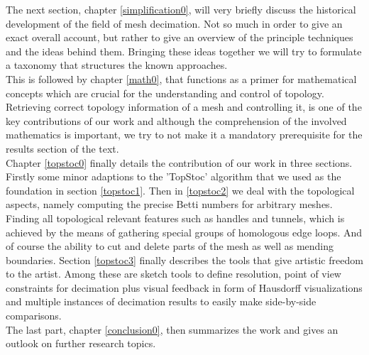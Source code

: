The next section, chapter \ref{simplification0}, will very briefly discuss the historical development of the field of mesh decimation.
Not so much in order to give an exact overall account, but rather to give an overview of the principle techniques and the ideas behind them.
Bringing these ideas together we will try to formulate a taxonomy that structures the known approaches.\\ 
This is followed by chapter \ref{math0}, that functions as a primer for mathematical concepts which are crucial for the understanding and control of topology.
Retrieving correct topology information of a mesh and controlling it, is one of the key contributions of our work and although the comprehension of the involved mathematics is important, we try to not make it a mandatory prerequisite for the results section of the text.\\
Chapter \ref{topstoc0} finally details the contribution of our work in three sections.
Firstly some minor adaptions to the 'TopStoc' algorithm that we used as the foundation in section \ref{topstoc1}.
Then in \ref{topstoc2} we deal with the topological aspects, namely computing the precise Betti numbers for arbitrary meshes.
Finding all topological relevant features such as handles and tunnels, which is achieved by the means of gathering special groups of homologous edge loops.
And of course the ability to cut and delete parts of the mesh as well as mending boundaries.
Section \ref{topstoc3} finally describes the tools that give artistic freedom to the artist.
Among these are sketch tools to define resolution, point of view constraints for decimation plus visual feedback in form of Hausdorff visualizations and multiple instances of decimation results to easily make side-by-side comparisons.\\
The last part, chapter \ref{conclusion0}, then summarizes the work and gives an outlook on further research topics.
